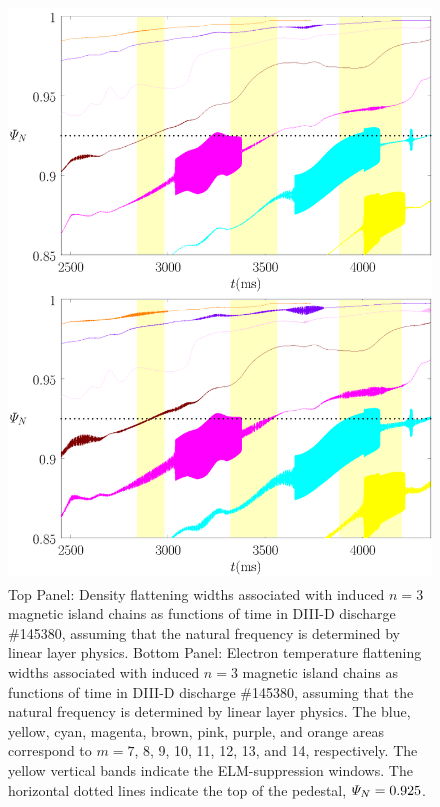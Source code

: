 \documentclass[12pt,prb,aps]{revtex4-1}
\begin{document}
\begin{figure}
\includegraphics[height=6in]{fig13.pdf}
\caption{Top Panel: Density flattening widths associated with induced $n=3$ magnetic island  chains as functions of time
in   DIII-D discharge \#145380, assuming that the natural frequency is determined by linear layer physics.
Bottom Panel:  Electron temperature flattening widths associated with induced $n=3$ magnetic island chains as functions of time
in   DIII-D discharge \#145380, assuming that the natural frequency is determined by linear layer physics. The blue, yellow, cyan, magenta, brown, pink,
purple, and orange  areas correspond to $m=7$, 8, 9, 10, 11, 12, 13, and 14, respectively. The yellow vertical bands indicate the ELM-suppression windows. 
The horizontal dotted lines indicate  the top of the pedestal, ${\mit\Psi}_N=0.925$.} \label{fig13}
\end{figure}
\end{document}
